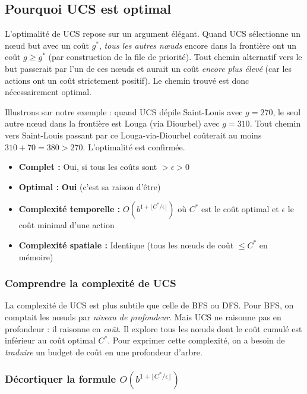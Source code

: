 \documentclass[11pt,a4paper]{article}
\begin{document}
\subsection{Pourquoi UCS est optimal}

L'optimalité de UCS repose sur un argument élégant. Quand UCS sélectionne un nœud but avec un coût $g^*$, \textit{tous les autres nœuds} encore dans la frontière ont un coût $g \geq g^*$ (par construction de la file de priorité). Tout chemin alternatif vers le but passerait par l'un de ces nœuds et aurait un coût \textit{encore plus élevé} (car les actions ont un coût strictement positif). Le chemin trouvé est donc nécessairement optimal.

Illustrons sur notre exemple : quand UCS dépile Saint-Louis avec $g = 270$, le seul autre nœud dans la frontière est Louga (via Diourbel) avec $g = 310$. Tout chemin vers Saint-Louis passant par ce Louga-via-Diourbel coûterait au moins $310 + 70 = 380 > 270$. L'optimalité est confirmée.

\begin{theorembox}
\begin{itemize}
    \item \textbf{Complet :} Oui, si tous les coûts sont $> \epsilon > 0$
    \item \textbf{Optimal :} \textbf{Oui} (c'est sa raison d'être)
    \item \textbf{Complexité temporelle :} $O(b^{1 + \lfloor C^*/\epsilon \rfloor})$ où $C^*$ est le coût optimal et $\epsilon$ le coût minimal d'une action
    \item \textbf{Complexité spatiale :} Identique (tous les nœuds de coût $\leq C^*$ en mémoire)
\end{itemize}
\end{theorembox}

\subsubsection*{Comprendre la complexité de UCS}

La complexité de UCS est plus subtile que celle de BFS ou DFS. Pour BFS, on comptait les nœuds par \textit{niveau de profondeur}. Mais UCS ne raisonne pas en profondeur : il raisonne en \textit{coût}. Il explore tous les nœuds dont le coût cumulé est inférieur au coût optimal $C^*$. Pour exprimer cette complexité, on a besoin de \textit{traduire} un budget de coût en une profondeur d'arbre.

\subsubsection*{Décortiquer la formule $O(b^{1+\lfloor C^*/\epsilon \rfloor})$}
\end{document}
